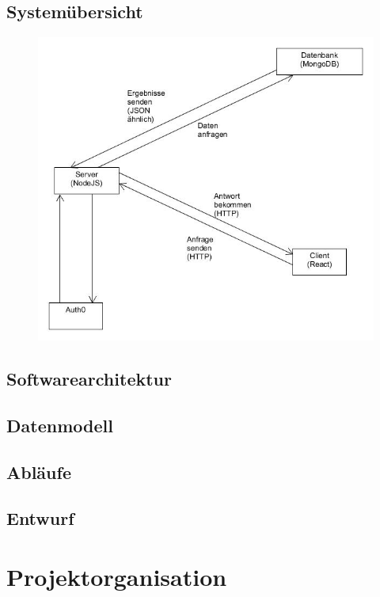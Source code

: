 	\subsection{Systemübersicht}
		\begin{figure}[H]
			\includegraphics[scale=0.8]{images/SYCArchitektur}
		\end{figure}
	
	\subsection{Softwarearchitektur}
	
	\subsection{Datenmodell}
	
	\subsection{Abläufe}
	
	\subsection{Entwurf}
	

\section{Projektorganisation}

